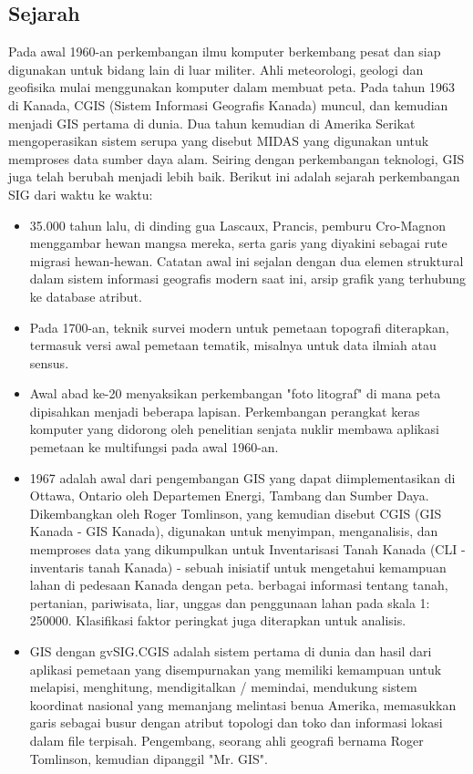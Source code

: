 \subsection{Sejarah}
Pada awal 1960-an perkembangan ilmu komputer berkembang pesat dan siap digunakan untuk bidang lain di luar militer. Ahli meteorologi, geologi dan geofisika mulai menggunakan komputer dalam membuat peta.
Pada tahun 1963 di Kanada, CGIS (Sistem Informasi Geografis Kanada) muncul, dan kemudian menjadi GIS pertama di dunia. Dua tahun kemudian di Amerika Serikat mengoperasikan sistem serupa yang disebut MIDAS yang digunakan untuk memproses data sumber daya alam.
Seiring dengan perkembangan teknologi, GIS juga telah berubah menjadi lebih baik. Berikut ini adalah sejarah perkembangan SIG dari waktu ke waktu:
\begin{itemize}
	\item35.000 tahun lalu, di dinding gua Lascaux, Prancis, pemburu Cro-Magnon menggambar hewan mangsa mereka, serta garis yang diyakini sebagai rute migrasi hewan-hewan. Catatan awal ini sejalan dengan dua elemen struktural dalam sistem informasi geografis modern saat ini, arsip grafik yang terhubung ke database atribut.
	\item Pada 1700-an, teknik survei modern untuk pemetaan topografi diterapkan, termasuk versi awal pemetaan tematik, misalnya untuk data ilmiah atau sensus.
	\item Awal abad ke-20 menyaksikan perkembangan "foto litograf" di mana peta dipisahkan menjadi beberapa lapisan. Perkembangan perangkat keras komputer yang didorong oleh penelitian senjata nuklir membawa aplikasi pemetaan ke multifungsi pada awal 1960-an.
	\item 1967 adalah awal dari pengembangan GIS yang dapat diimplementasikan di Ottawa, Ontario oleh Departemen Energi, Tambang dan Sumber Daya. Dikembangkan oleh Roger Tomlinson, yang kemudian disebut CGIS (GIS Kanada - GIS Kanada), digunakan untuk menyimpan, menganalisis, dan memproses data yang dikumpulkan untuk Inventarisasi Tanah Kanada (CLI - inventaris tanah Kanada) - sebuah inisiatif untuk mengetahui kemampuan lahan di pedesaan Kanada dengan peta. berbagai informasi tentang tanah, pertanian, pariwisata, liar, unggas dan penggunaan lahan pada skala 1: 250000. Klasifikasi faktor peringkat juga diterapkan untuk analisis.
	\item GIS dengan gvSIG.CGIS adalah sistem pertama di dunia dan hasil dari aplikasi pemetaan yang disempurnakan yang memiliki kemampuan untuk melapisi, menghitung, mendigitalkan / memindai, mendukung sistem koordinat nasional yang memanjang melintasi benua Amerika, memasukkan garis sebagai busur dengan atribut topologi dan toko dan informasi lokasi dalam file terpisah. Pengembang, seorang ahli geografi bernama Roger Tomlinson, kemudian dipanggil "Mr. GIS".

\end{itemize}
